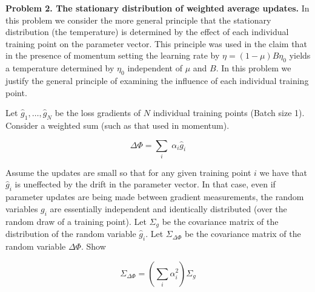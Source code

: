 \documentclass{article}
\begin{document}
\bigskip

{\bf Problem 2. The stationary distribution of weighted average updates.}  In this problem we consider the more general principle that the
stationary distribution (the temperature) is determined by the effect of each individual training point on the parameter vector.  This principle was used in the
claim that in the presence of momentum setting the learning rate by $\eta = (1-\mu)B\eta_0$ yields a temperature determined by $\eta_0$ independent of
$\mu$ and $B$.
In this problem we justify the general principle of examining the influence of each individual training point.

\medskip
Let $\hat{g}_1, \ldots, \hat{g}_N$
be the loss gradients of $N$ individual training points (Batch size 1).  Consider a weighted sum (such as that used in momentum).

$$\Delta \Phi = \sum_i\; \alpha_i\hat{g}_i$$

Assume the updates are small so that for any given training point $i$ we have that $\hat{g}_i$ is uneffected by the drift in the parameter vector.
In that case, even if parameter updates are being made between gradient measurements, the random variables $g_i$ are essentially independent
and identically distributed (over the random draw of a training point).  Let $\Sigma_g$ be the covariance matrix of the distribution of the
random variable $\hat{g}_i$.  Let $\Sigma_{\Delta \Phi}$ be the covariance matrix of the random variable $\Delta \Phi$.
Show

$$\Sigma_{\Delta \Phi} = \left(\sum_i \alpha_i^2\right)\Sigma_g$$
\end{document}
